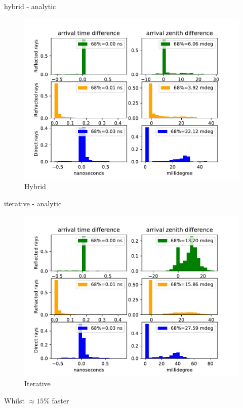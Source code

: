 \documentclass{beamer}
\begin{document}
\begin{frame}
	\begin{minipage}{0.49\textwidth}
    hybrid - analytic
	\begin{figure}
		\centering
		\includegraphics[width=\textwidth]{figures/hybrid_comparison_N_1000.pdf}
		\caption{Hybrid}
	\end{figure}
	\end{minipage}
	\begin{minipage}{0.49\textwidth}
    iterative - analytic
	\begin{figure}
		\centering
		\includegraphics[width=\textwidth]{figures/iterative_comparison_N_1000.pdf}
		\caption{Iterative}
	\end{figure}
	\end{minipage}
Whilst $\approx 15\%$ faster
\end{frame}
\end{document}
